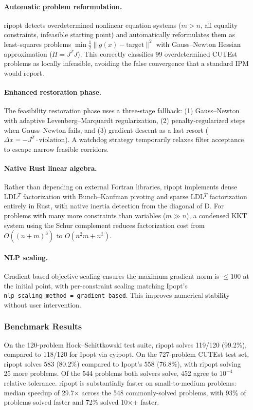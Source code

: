 \documentclass[12pt,preprint]{article}
\begin{document}
\paragraph{Automatic problem reformulation.}
ripopt detects overdetermined nonlinear equation systems ($m > n$, all equality constraints, infeasible starting point) and automatically reformulates them as least-squares problems $\min \frac{1}{2}\|g(x) - \text{target}\|^2$ with Gauss--Newton Hessian approximation ($H = J^T J$). This correctly classifies 99 overdetermined CUTEst problems as locally infeasible, avoiding the false convergence that a standard IPM would report.

\paragraph{Enhanced restoration phase.}
The feasibility restoration phase uses a three-stage fallback: (1) Gauss--Newton with adaptive Levenberg--Marquardt regularization, (2) penalty-regularized steps when Gauss--Newton fails, and (3) gradient descent as a last resort ($\Delta x = -J^T \cdot \text{violation}$). A watchdog strategy temporarily relaxes filter acceptance to escape narrow feasible corridors.

\paragraph{Native Rust linear algebra.}
Rather than depending on external Fortran libraries, ripopt implements dense LDL$^T$ factorization with Bunch--Kaufman pivoting and sparse LDL$^T$ factorization entirely in Rust, with native inertia detection from the diagonal of D. For problems with many more constraints than variables ($m \gg n$), a condensed KKT system using the Schur complement reduces factorization cost from $O((n+m)^3)$ to $O(n^2 m + n^3)$.

\paragraph{NLP scaling.}
Gradient-based objective scaling ensures the maximum gradient norm is $\le 100$ at the initial point, with per-constraint scaling matching Ipopt's \texttt{nlp\_scaling\_method = gradient-based}. This improves numerical stability without user intervention.

\subsubsection{Benchmark Results}
\label{org-ripopt-benchmarks}
On the 120-problem Hock--Schittkowski test suite, ripopt solves 119/120 (99.2\%), compared to 118/120 for Ipopt via cyipopt. On the 727-problem CUTEst test set, ripopt solves 583 (80.2\%) compared to Ipopt's 558 (76.8\%), with ripopt solving 25 more problems. Of the 544 problems both solvers solve, 452 agree to $10^{-4}$ relative tolerance. ripopt is substantially faster on small-to-medium problems: median speedup of 29.7$\times$ across the 548 commonly-solved problems, with 93\% of problems solved faster and 72\% solved 10$\times$+ faster.
\end{document}
